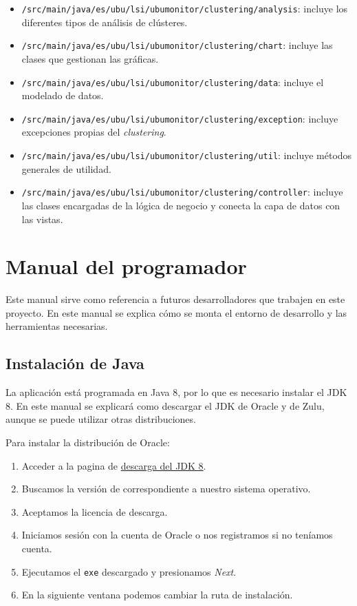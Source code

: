 \begin{itemize}
	\item \texttt{/src/main/java/es/ubu/lsi/ubumonitor/clustering/analysis}: incluye los diferentes tipos de análisis de clústeres.
	\item \texttt{/src/main/java/es/ubu/lsi/ubumonitor/clustering/chart}: incluye las clases que gestionan las gráficas.
	\item \texttt{/src/main/java/es/ubu/lsi/ubumonitor/clustering/data}:
	incluye el modelado de datos.
	\item \texttt{/src/main/java/es/ubu/lsi/ubumonitor/clustering/exception}: incluye excepciones propias del \emph{clustering}.
	\item \texttt{/src/main/java/es/ubu/lsi/ubumonitor/clustering/util}: incluye métodos generales de utilidad.
	\item \texttt{/src/main/java/es/ubu/lsi/ubumonitor/clustering/controller}: incluye las clases encargadas de la lógica de negocio y conecta la capa de datos con las vistas.
\end{itemize}

\section{Manual del programador}
Este manual sirve como referencia a futuros desarrolladores que trabajen en este proyecto. En este manual se explica cómo se monta el entorno de desarrollo y las herramientas necesarias.

\subsection{Instalación de Java}
La aplicación está programada en Java 8, por lo que es necesario instalar el JDK 8. En este manual se explicará como descargar el JDK de Oracle y de Zulu, aunque se puede utilizar otras distribuciones.

Para instalar la distribución de Oracle:
\begin{enumerate}
	\item Acceder a la pagina de  \href{https://www.oracle.com/java/technologies/javase/javase-jdk8-downloads.html}{descarga del JDK 8}.
	\item Buscamos la versión de correspondiente a nuestro sistema operativo.
	\item Aceptamos la licencia de descarga.
	\item Iniciamos sesión con la cuenta de Oracle o nos registramos si no teníamos cuenta.
	\item Ejecutamos el \texttt{exe} descargado y presionamos \emph{Next}.
	\item En la siguiente ventana podemos cambiar la ruta de instalación.
\end{enumerate}

